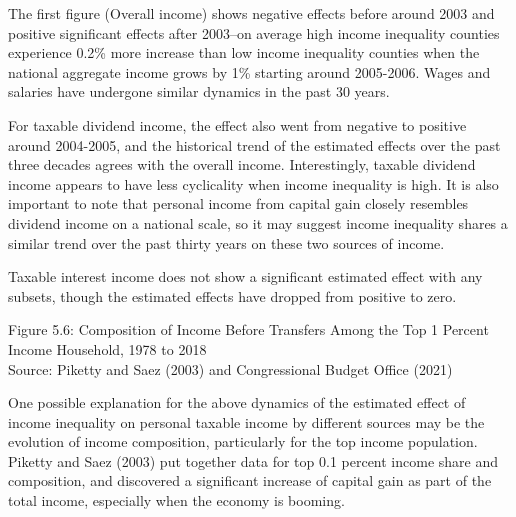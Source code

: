 \documentclass{article}
\begin{document}
The first figure (Overall income) shows negative effects before around 2003 and positive significant effects after 2003--on average high income inequality counties experience 0.2\% more increase than low income inequality counties when the national aggregate income grows by 1\% starting around 2005-2006. Wages and salaries have undergone similar dynamics in the past 30 years. 

For taxable dividend income, the effect also went from negative to positive around 2004-2005, and the historical trend of the estimated effects over the past three decades agrees with the overall income. Interestingly, taxable dividend income appears to have less cyclicality when income inequality is high. It is also important to note that personal income from capital gain closely resembles dividend income on a national scale, so it may suggest income inequality shares a similar trend over the past thirty years on these two sources of income. 

Taxable interest income does not show a significant estimated effect with any subsets, though the estimated effects have dropped from positive to zero.

\begin{center}
Figure 5.6: Composition of Income Before Transfers Among the Top 1 Percent Income Household, 1978 to 2018\\
\noindent
{}
Source: Piketty and Saez (2003) and Congressional Budget Office (2021)
\end{center}

One possible explanation for the above dynamics of the estimated effect of income inequality on personal taxable income by different sources may be the evolution of income composition, particularly for the top income population. Piketty and Saez (2003) put together data for top 0.1 percent income share and composition, and discovered a significant increase of capital gain as part of the total income, especially when the economy is booming. 
\end{document}
